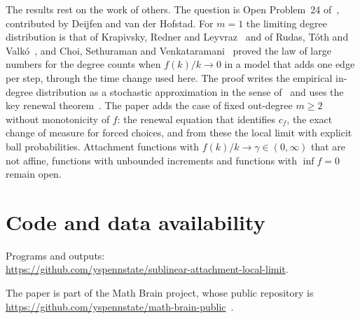 \documentclass[11pt]{amsart}
\theoremstyle{definition}
\begin{document}
The results rest on the work of others. The question is Open Problem~24 of~\cite{Aletti}, contributed by Deijfen
and van der Hofstad. For $m=1$ the limiting degree distribution is that of Krapivsky, Redner and
Leyvraz~\cite{KRL} and of Rudas, T\'oth and Valk\'o~\cite{RTV}, and Choi, Sethuraman and Venkataramani~\cite{CSV}
proved the law of large numbers for the degree counts when $f(k)/k\to0$ in a model that adds one edge per step,
through the time change used here. The proof writes the empirical in-degree distribution as a stochastic
approximation in the sense of~\cite{Benaim,Pemantle} and uses the key renewal theorem~\cite[Chapter~XI]{Feller}.
The paper adds the case of fixed out-degree $m\ge2$ without monotonicity of $f$: the renewal equation that
identifies $c_f$, the exact change of measure for forced choices, and from these the local limit with explicit
ball probabilities. Attachment functions with $f(k)/k\to\gamma\in(0,\infty)$ that are not affine, functions with
unbounded increments and functions with $\inf f=0$ remain open.

\section*{Code and data availability}
Programs and outputs:\\
\url{https://github.com/yspennstate/sublinear-attachment-local-limit}.

The paper is part of the Math Brain project, whose public repository is
\url{https://github.com/yspennstate/math-brain-public}~\cite{MathBrainRepo}.
\end{document}
